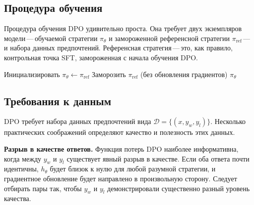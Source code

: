 \subsection{Процедура обучения}

Процедура обучения DPO удивительно проста. Она требует двух экземпляров модели\,---\,обучаемой стратегии $\pi_\theta$ и замороженной референсной стратегии $\pi_\mathrm{ref}$\,---\,и набора данных предпочтений. Референсная стратегия\,---\,это, как правило, контрольная точка SFT, замороженная с начала обучения DPO.

\begin{algorithm}[ht]
\caption{Прямая оптимизация предпочтений (DPO)}
\label{alg:dpo}
Инициализировать $\pi_\theta \leftarrow \pi_\mathrm{ref}$\;
Заморозить $\pi_\mathrm{ref}$ (без обновления градиентов)\;
\Return $\pi_\theta$
\end{algorithm}

\subsection{Требования к данным}

DPO требует набора данных предпочтений вида $\mathcal{D} = \{(x, y_w, y_l)\}$. Несколько практических соображений определяют качество и полезность этих данных.

\textbf{Разрыв в качестве ответов.} Функция потерь DPO наиболее информативна, когда между $y_w$ и $y_l$ существует явный разрыв в качестве. Если оба ответа почти идентичны, $h_\theta$ будет близок к нулю для любой разумной стратегии, и градиентное обновление будет направлено в произвольную сторону. Следует отбирать пары так, чтобы $y_w$ и $y_l$ демонстрировали существенно разный уровень качества.

